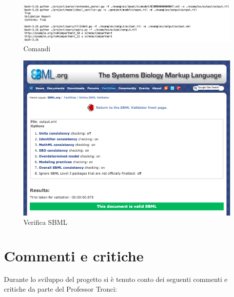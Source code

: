 \documentclass{article}
\begin{document}
\begin{figure}[h!t]
    \caption{Comandi}
    \label{fig:example_commands}
    \includegraphics[scale=0.366]{images/example_commands.png}
\end{figure}

\begin{figure}[H]
    \caption{Verifica SBML}
    \label{fig:example_validation}
    \includegraphics[scale=0.43]{images/example_validation.png}
\end{figure}

\section{Commenti e critiche}
Durante lo sviluppo del progetto si è tenuto conto dei seguenti commenti e critiche da parte del Professor Tronci:
\end{document}
